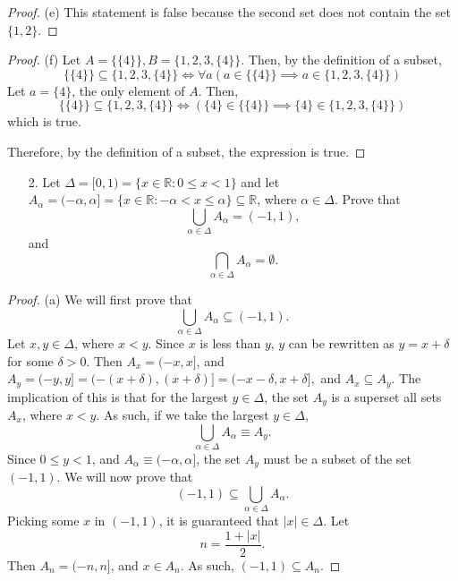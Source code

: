 \documentclass[10pt]{article}
\theoremstyle{definition}
\theoremstyle{definition}
\theoremstyle{plain}
\newcommand{\R}{\mathbb{R}}
\begin{document}
\begin{proof}{(e)}
This statement is false because the second set does not contain the set $\{1,2\}$.
\end{proof}

\begin{proof}{(f)}
Let $A=\{\{4\}\}, B = \{1,2,3,\{4\}\}$. Then, by the definition of a subset,
\begin{equation*}
\{\{4\}\} \subseteq \{1,2,3,\{4\}\} \iff \forall a(a\in \{\{4\}\} \implies a\in \{1,2,3,\{4\}\})
\end{equation*}
Let $a=\{4\}$, the only element of $A$. Then,
\begin{equation*}
\{\{4\}\} \subseteq \{1,2,3,\{4\}\} \iff (\{4\}\in \{\{4\}\} \implies \{4\}\in \{1,2,3,\{4\}\})
\end{equation*}
which is true.

\bigskip

\noindent Therefore, by the definition of a subset, the expression is true.
\end{proof}



\pagebreak



\begin{enumerate}
\item[2.] Let $\Delta = [0,1) = \{x \in \R: 0 \leq x < 1\}$ and let $A_\alpha = (-\alpha,\alpha] = \{x \in \R: -\alpha < x \leq \alpha\} \subseteq \R$, where $\alpha \in \Delta$. Prove that
$$
\bigcup_{\alpha \in \Delta} A_\alpha = (-1,1),
$$
and
$$
\bigcap_{\alpha \in \Delta} A_\alpha = \emptyset.
$$
\end{enumerate}

\begin{proof}{(a)}
We will first prove that
$$
\bigcup_{\alpha \in \Delta} A_\alpha \subseteq (-1,1).
$$
Let $x,y\in\Delta$, where $x<y$. Since $x$ is less than $y$, $y$ can be rewritten as $y=x+\delta$ for some $\delta>0.$ Then $A_x = (-x,x]$, and $A_y = (-y, y] = (-(x+\delta), (x+\delta)] = (-x-\delta, x+\delta],$ and $A_x\subseteq A_y.$ The implication of this is that for the largest $y\in\Delta$, the set $A_y$ is a superset all sets $A_x$, where $x<y$. As such, if we take the largest $y\in\Delta$,
$$
\bigcup_{\alpha \in \Delta} A_\alpha \equiv A_y.
$$
Since $0 \leq y < 1$, and $A_\alpha \equiv (-\alpha,\alpha]$, the set $A_y$ must be a subset of the set $(-1,1)$. We will now prove that
$$
(-1,1) \subseteq \bigcup_{\alpha \in \Delta} A_\alpha.
$$
Picking some $x$ in $(-1,1)$, it is guaranteed that $|x|\in\Delta$. Let 
$$
n= \frac{1+|x|}{2}.
$$
Then $A_n = (-n, n]$, and $x\in A_n$. As such, $(-1,1)\subseteq A_n$.
\end{proof}
\end{document}
